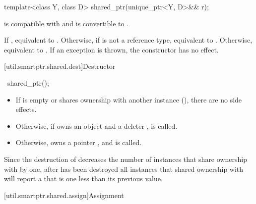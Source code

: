 %
%
\begin{itemdecl}
template<class Y, class D> shared_ptr(unique_ptr<Y, D>&& r);
\end{itemdecl}

\begin{itemdescr}
\pnum
\constraints
{} is compatible with  and
 is convertible to .

\pnum
\effects
If , equivalent to .
Otherwise, if  is not a reference type,
equivalent to .
Otherwise, equivalent to .
If an exception is thrown, the constructor has no effect.
\end{itemdescr}

[util.smartptr.shared.dest]{Destructor}

%
\begin{itemdecl}
~shared_ptr();
\end{itemdecl}

\begin{itemdescr}
\pnum
\effects
\begin{itemize}
\item If  is empty or shares ownership with another
 instance (), there are no side effects.

\item
Otherwise, if  owns an object
 and a deleter ,  is called.

\item Otherwise,  owns a pointer ,
and  is called.
\end{itemize}
\end{itemdescr}

\pnum
\begin{note}
Since the destruction of 
decreases the number of instances that share ownership with 
by one,
after  has been destroyed
all  instances that shared ownership with
 will report a  that is one less
than its previous value.
\end{note}

[util.smartptr.shared.assign]{Assignment}

